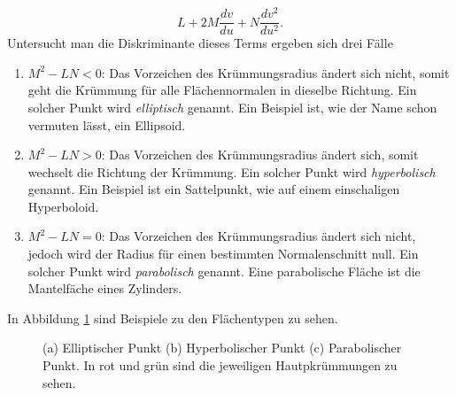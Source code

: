 \begin{equation}
   L + 2M \frac{d v}{d u} + N \frac{d v^2}{d u ^2}.
  \label{mongemapere:dsik}
\end{equation}
Untersucht man die Diskriminante dieses Terms ergeben sich drei Fälle
\begin{enumerate}
  \item $M^2 - LN < 0$: Das Vorzeichen des Krümmungsradius ändert sich nicht, somit geht die Krümmung für alle 
    Flächennormalen in dieselbe Richtung. 
    Ein solcher Punkt wird \emph{elliptisch} genannt. Ein Beispiel ist, wie der 
    Name schon vermuten lässt, ein Ellipsoid.
  \item $M^2 - LN > 0$: Das Vorzeichen des Krümmungsradius ändert sich, somit wechselt die Richtung der Krümmung.
    Ein solcher Punkt wird \emph{hyperbolisch} genannt. Ein Beispiel ist ein Sattelpunkt, wie auf einem einschaligen Hyperboloid.
  \item $M^2 - LN = 0$: Das Vorzeichen des Krümmungsradius ändert sich nicht, jedoch wird der Radius für einen 
    bestimmten Normalenschnitt null. 
    Ein solcher Punkt wird \emph{parabolisch} genannt. Eine parabolische Fläche ist die Mantelfäche eines Zylinders. 
\end{enumerate}
In Abbildung \ref{mongeampere:arten} sind Beispiele zu den Flächentypen zu sehen.
\begin{figure}
	\centering
	\caption{(a) Elliptischer Punkt (b) Hyperbolischer Punkt  (c) Parabolischer Punkt. In rot und grün sind die jeweiligen Hautpkrümmungen zu sehen.}
	\label{mongeampere:arten}\end{figure}
